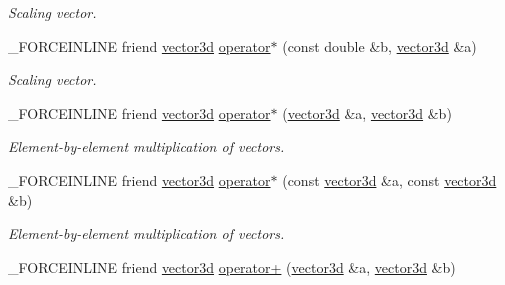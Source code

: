 \begin{DoxyCompactItemize}
\begin{DoxyCompactList}\small\item\em Scaling vector. \end{DoxyCompactList}\item 
\hypertarget{classbt_1_1vector3d_a5d2160a3f261fb85468db4299d916b34}{\-\_\-\-F\-O\-R\-C\-E\-I\-N\-L\-I\-N\-E friend \hyperlink{classbt_1_1vector3d}{vector3d} \hyperlink{classbt_1_1vector3d_a5d2160a3f261fb85468db4299d916b34}{operator$\ast$} (const double \&b, \hyperlink{classbt_1_1vector3d}{vector3d} \&a)}\label{classbt_1_1vector3d_a5d2160a3f261fb85468db4299d916b34}

\begin{DoxyCompactList}\small\item\em Scaling vector. \end{DoxyCompactList}\item 
\hypertarget{classbt_1_1vector3d_ade74ad56278c5e476da9a5c75416d0f2}{\-\_\-\-F\-O\-R\-C\-E\-I\-N\-L\-I\-N\-E friend \hyperlink{classbt_1_1vector3d}{vector3d} \hyperlink{classbt_1_1vector3d_ade74ad56278c5e476da9a5c75416d0f2}{operator$\ast$} (\hyperlink{classbt_1_1vector3d}{vector3d} \&a, \hyperlink{classbt_1_1vector3d}{vector3d} \&b)}\label{classbt_1_1vector3d_ade74ad56278c5e476da9a5c75416d0f2}

\begin{DoxyCompactList}\small\item\em Element-\/by-\/element multiplication of vectors. \end{DoxyCompactList}\item 
\hypertarget{classbt_1_1vector3d_a17a744c5ed0c59cd5a40f29e5b34e72b}{\-\_\-\-F\-O\-R\-C\-E\-I\-N\-L\-I\-N\-E friend \hyperlink{classbt_1_1vector3d}{vector3d} \hyperlink{classbt_1_1vector3d_a17a744c5ed0c59cd5a40f29e5b34e72b}{operator$\ast$} (const \hyperlink{classbt_1_1vector3d}{vector3d} \&a, const \hyperlink{classbt_1_1vector3d}{vector3d} \&b)}\label{classbt_1_1vector3d_a17a744c5ed0c59cd5a40f29e5b34e72b}

\begin{DoxyCompactList}\small\item\em Element-\/by-\/element multiplication of vectors. \end{DoxyCompactList}\item 
\hypertarget{classbt_1_1vector3d_aefb51ccfefd4aae0062d07c326f5a77e}{\-\_\-\-F\-O\-R\-C\-E\-I\-N\-L\-I\-N\-E friend \hyperlink{classbt_1_1vector3d}{vector3d} \hyperlink{classbt_1_1vector3d_aefb51ccfefd4aae0062d07c326f5a77e}{operator+} (\hyperlink{classbt_1_1vector3d}{vector3d} \&a, \hyperlink{classbt_1_1vector3d}{vector3d} \&b)}\label{classbt_1_1vector3d_aefb51ccfefd4aae0062d07c326f5a77e}


\end{DoxyCompactItemize}
